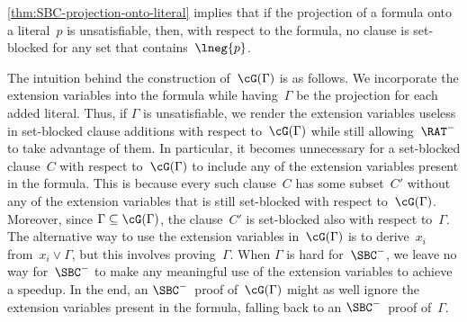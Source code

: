 \documentclass[12pt]{article}
\begin{document}
\cref{thm:SBC-projection-onto-literal} implies that
if the projection of a formula onto a literal~$p$ is unsatisfiable,
then, with respect to the formula, no clause is set-blocked
for any set that contains~$\lneg{p}$.

The intuition behind the construction of~$\cG(\Gamma)$ is as follows.
We incorporate the extension variables
into the formula while having~$\Gamma$ be
the projection for each added literal.
Thus, if $\Gamma$ is unsatisfiable,
we render the extension variables useless
in set-blocked clause additions with respect to~$\cG(\Gamma)$
while still allowing~$\RAT^-$ to take advantage of them.
In particular, it becomes unnecessary for a set-blocked clause~$C$
with respect to~$\cG(\Gamma)$ to include
any of the extension variables present in the formula.
This is because every such clause~$C$ has some subset~$C'$
without any of the extension variables
that is still set-blocked with respect to~$\cG(\Gamma)$.
Moreover, since $\Gamma \subseteq \cG(\Gamma)$, the clause~$C'$
is set-blocked also with respect to~$\Gamma$.
The alternative way to use the extension variables in~$\cG(\Gamma)$
is to derive~$x_i$ from~$x_i \lor \Gamma$,
but this involves proving~$\Gamma$.
When $\Gamma$ is hard for~$\SBC^-$, we leave no way for~$\SBC^-$
to make any meaningful use of the extension variables to achieve a speedup.
In the end, an $\SBC^-$~proof of~$\cG(\Gamma)$ might as well
ignore the extension variables present in the formula,
falling back to an $\SBC^-$~proof of~$\Gamma$.
\end{document}
